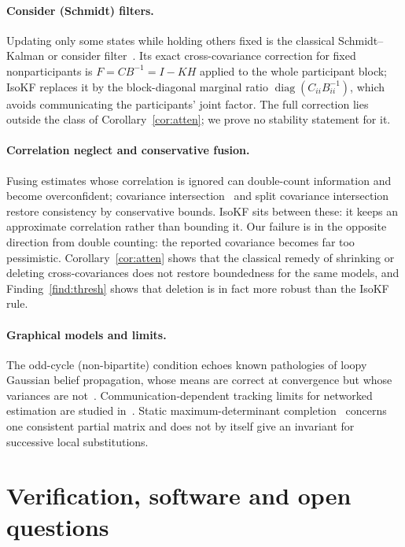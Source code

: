 \documentclass[11pt,a4paper]{article}
\numberwithin{equation}{section}
\theoremstyle{remark}\newtheorem{remark}[theorem]{Remark}
\newcommand{\diag}{\operatorname{diag}}
\begin{document}
\paragraph{Consider (Schmidt) filters.} Updating only some states while holding others fixed is
the classical Schmidt--Kalman or consider filter~\citep{Schmidt1966}. Its exact cross-covariance
correction for fixed nonparticipants is $F=CB^{-1}=I-KH$ applied to the whole participant block;
IsoKF replaces it by the block-diagonal marginal ratio $\diag(C_{ii}B_{ii}^{-1})$, which avoids
communicating the participants' joint factor. The full correction lies outside the class of
Corollary~\ref{cor:atten}; we prove no stability statement for it.

\paragraph{Correlation neglect and conservative fusion.} Fusing estimates whose correlation is
ignored can double-count information and become overconfident; covariance
intersection~\citep{JulierUhlmann1997} and split covariance
intersection~\citep{LiNashashibi2012} restore consistency by conservative bounds. IsoKF sits
between these: it keeps an approximate correlation rather than bounding it. Our failure is in
the opposite direction from double counting: the reported covariance becomes far too
pessimistic. Corollary~\ref{cor:atten} shows that the classical remedy of shrinking or deleting
cross-covariances does not restore boundedness for the same models, and
Finding~\ref{find:thresh} shows that deletion is in fact more robust than the IsoKF rule.

\paragraph{Graphical models and limits.} The odd-cycle (non-bipartite) condition echoes known
pathologies of loopy Gaussian belief propagation, whose means are correct at convergence but
whose variances are not~\citep{WeissFreeman2001}. Communication-dependent tracking limits for
networked estimation are studied in~\citep{KhanJadbabaie2011}. Static maximum-determinant
completion~\citep{Georgescu2018} concerns one consistent partial matrix and does not by itself
give an invariant for successive local substitutions.

\section{Verification, software and open questions}\label{sec:verif}
\end{document}
